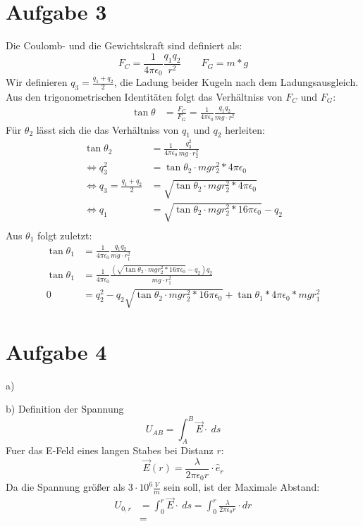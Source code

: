 \documentclass[a4paper]{article}
\newcommand{\kco}{\frac{1}{4\pi\epsilon_0}}
\begin{document}
\newpage
\setlength{\headheight}{0cm}
\section*{Aufgabe 3}
Die Coulomb- und die Gewichtskraft sind definiert als:
\[
	F_C = \kco \frac{q_1q_2}{r^2} \qquad F_G = m*g
\]
Wir definieren $q_3 = \frac{q_1 + q_2}{2} $, die Ladung  beider Kugeln nach dem Ladungsausgleich. Aus den trigonometrischen Identitäten folgt das Verhältniss von $F_C$ und $F_G$:
\begin{align*}
	\tan \theta &= \frac{F_C}{F_G} =  \kco \frac{q_1q_2}{mg \cdot r^2}
\end{align*}
Für $\theta_2$ lässt sich die das Verhältniss von $q_1$ und $q_2$ herleiten:
\begin{align*}
	\tan \theta_2 &= \kco \frac{q_3^2}{mg \cdot r_2^2} \\
	\Leftrightarrow
	q_3^2 &= \tan \theta_2 \cdot mg r_2^2 * 4\pi\epsilon_0 \\
	\Leftrightarrow
	q_3 = \frac{q_1 + q_2}{2} &= \sqrt{\tan \theta_2 \cdot mg r_2^2 * 4\pi\epsilon_0} \\
	\Leftrightarrow
	q_1 &= \sqrt{\tan \theta_2 \cdot mg r_2^2 * 16\pi\epsilon_0} - q_2 \\
\end{align*}
Aus $\theta_1$ folgt zuletzt:
\begin{align*}
	\tan \theta_1 &= \kco \frac{q_1q_2}{mg \cdot r_1^2} \\
	\tan \theta_1 &= \kco \frac{ \left( \sqrt{\tan \theta_2 \cdot mg r_2^2 * 16\pi\epsilon_0} - q_2 \right) q_2}{mg \cdot r_1^2} \\
	0 &= q_2^2 - q_2 \sqrt{\tan \theta_2 \cdot mg r_2^2 * 16\pi\epsilon_0}  + \tan \theta_1 * 4\pi\epsilon_0	*mg r_1^2 
\end{align*}


\section*{Aufgabe 4}
\par{a)}
\par{b)}
Definition der Spannung
\[ U_{AB} = \int_A^B \vec{E} \cdot \ ds \]
Fuer das E-Feld eines langen Stabes bei Distanz $r$:
\[ \vec{E}(r) = \frac{\lambda}{2\pi\epsilon_0 r} \cdot \hat{e}_r \]
Da die Spannung größer als $3\cdot 10^6 \frac{V}{m}$ sein soll, ist der Maximale Abstand:
\begin{align*}
	U_{0, r} 
	&= \int_0^r \vec{E} \cdot \ ds = \int_0^r \frac{\lambda}{2\pi\epsilon_0 r} \cdot dr \\
	&= 	
\end{align*}
\end{document}
